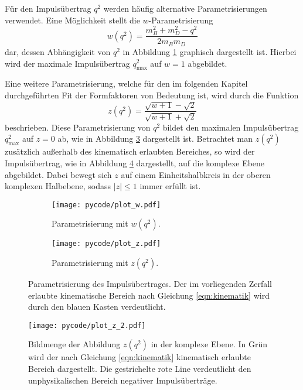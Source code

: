 Für den Impulsübertrag $q^2$ werden häufig alternative Parametrisierungen verwendet.
Eine Möglichkeit stellt die $w$-Parametrisierung
\begin{equation}
  w(q^2) = \frac{m_B^2 + m_D^2 - q^2}{2 m_B m_D}
\end{equation}
dar, dessen Abhängigkeit von $q^2$ in Abbildung \ref{fig:w_param} graphisch dargestellt ist.
Hierbei wird der maximale Impulsübertrag $q_\text{max}^2$ auf $w=1$ abgebildet.

Eine weitere Parametrisierung, welche für den im folgenden Kapitel durchgeführten Fit der Formfaktoren von Bedeutung ist, wird durch die Funktion
\begin{equation}
  z(q^2) = \frac{\sqrt{w+1}-\sqrt{2}}{\sqrt{w+1}+\sqrt{2}}
\end{equation}
beschrieben.
Diese Parametrisierung von $q^2$ bildet den maximalen Impulsübertrag $q_\text{max}^2$ auf $z=0$ ab, wie in Abbildung \ref{fig:z_param} dargestellt ist.
Betrachtet man $z(q^2)$ zusätzlich außerhalb des kinematisch erlaubten Bereiches, so wird der Impulsübertrag, wie in Abbildung \ref{fig:z_kreis} dargestellt, auf die komplexe Ebene abgebildet.
Dabei bewegt sich $z$ auf einem Einheitshalbkreis in der oberen komplexen Halbebene, sodass $\lvert z \rvert \leq \num{1}$ immer erfüllt ist.

\begin{figure}
  \centering
  \begin{subfigure}{0.48\textwidth}
    \centering
    \texttt{[image: pycode/plot\_w.pdf]}
    \caption{Parametrisierung mit $w(q^2)$.}
    \label{fig:w_param}
  \end{subfigure}
  \begin{subfigure}{0.48\textwidth}
    \centering
    \texttt{[image: pycode/plot\_z.pdf]}
    \caption{Parametrisierung mit $z(q^2)$.}
    \label{fig:z_param}
  \end{subfigure}
  \caption{Parametrisierung des Impulsübertrages. Der im vorliegenden Zerfall erlaubte kinematische Bereich nach Gleichung \eqref{eqn:kinematik} wird durch den blauen Kasten verdeutlicht.}
\end{figure}

\begin{figure}
  \centering
  \texttt{[image: pycode/plot\_z\_2.pdf]}
  \caption{Bildmenge der Abbildung $z(q^2)$ in der komplexe Ebene. In Grün wird der nach Gleichung \eqref{eqn:kinematik} kinematisch erlaubte Bereich dargestellt. Die gestrichelte rote Line verdeutlicht den unphysikalischen Bereich negativer Impulsüberträge.}
  \label{fig:z_kreis}
\end{figure}

